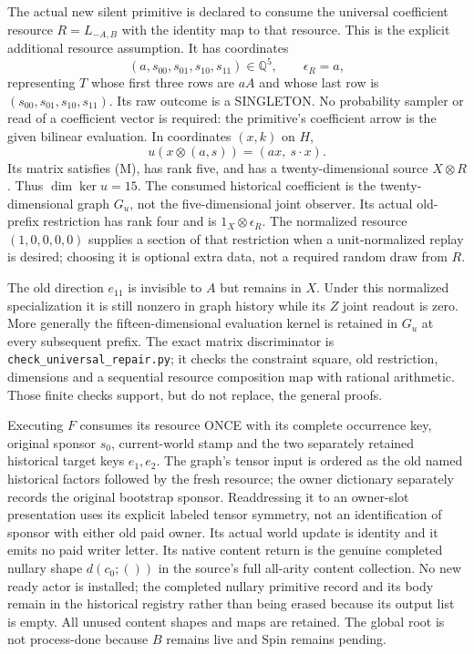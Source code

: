 \documentclass[11pt]{article}
\begin{document}
The actual new silent primitive is declared to consume the universal coefficient resource $R=L_{-A,B}$ with the identity map to that resource. This is the explicit additional resource assumption. It has coordinates
\[
 (a,s_{00},s_{01},s_{10},s_{11})\in\mathbb Q^5,
 \qquad\epsilon_R=a,
\]
representing $T$ whose first three rows are $aA$ and whose last row is $(s_{00},s_{01},s_{10},s_{11})$. Its raw outcome is a SINGLETON. No probability sampler or read of a coefficient vector is required: the primitive's coefficient arrow is the given bilinear evaluation. In coordinates $(x,k)$ on $H$,
\[
 u(x\otimes(a,s))=(a x,\ s\cdot x).
\]
Its matrix satisfies (M), has rank five, and has a twenty-dimensional source $X\otimes R$. Thus $\dim\ker u=15$. The consumed historical coefficient is the twenty-dimensional graph $G_u$, not the five-dimensional joint observer. Its actual old-prefix restriction has rank four and is $1_X\otimes\epsilon_R$. The normalized resource $(1,0,0,0,0)$ supplies a section of that restriction when a unit-normalized replay is desired; choosing it is optional extra data, not a required random draw from $R$.

The old direction $e_{11}$ is invisible to $A$ but remains in $X$. Under this normalized specialization it is still nonzero in graph history while its $Z$ joint readout is zero. More generally the fifteen-dimensional evaluation kernel is retained in $G_u$ at every subsequent prefix. The exact matrix discriminator is \texttt{check\_universal\_repair.py}; it checks the constraint square, old restriction, dimensions and a sequential resource composition map with rational arithmetic. Those finite checks support, but do not replace, the general proofs.

Executing $F$ consumes its resource ONCE with its complete occurrence key, original sponsor $s_0$, current-world stamp and the two separately retained historical target keys $e_1,e_2$. The graph's tensor input is ordered as the old named historical factors followed by the fresh resource; the owner dictionary separately records the original bootstrap sponsor. Readdressing it to an owner-slot presentation uses its explicit labeled tensor symmetry, not an identification of sponsor with either old paid owner. Its actual world update is identity and it emits no paid writer letter. Its native content return is the genuine completed nullary shape $d(c_0;())$ in the source's full all-arity content collection. No new ready actor is installed; the completed nullary primitive record and its body remain in the historical registry rather than being erased because its output list is empty. All unused content shapes and maps are retained. The global root is not process-done because $B$ remains live and Spin remains pending.
\end{document}
